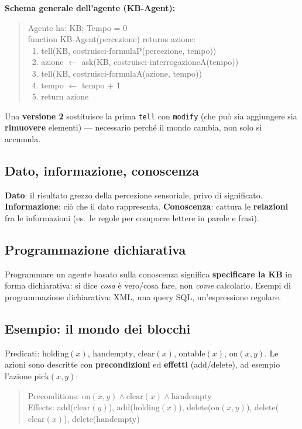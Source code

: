\documentclass[11pt,a4paper]{report}
\begin{document}
\textbf{Schema generale dell'agente (KB-Agent):}
\begin{quote}
\ttfamily
Agente ha: KB; Tempo = 0\\
function KB-Agent(percezione) returns azione:\\
\ 1. tell(KB, costruisci-formulaP(percezione, tempo))\\
\ 2. azione $\leftarrow$ ask(KB, costruisci-interrogazioneA(tempo))\\
\ 3. tell(KB, costruisci-formulaA(azione, tempo))\\
\ 4. tempo $\leftarrow$ tempo + 1\\
\ 5. return azione
\end{quote}

Una \textbf{versione 2} sostituisce la prima \texttt{tell} con \texttt{modify} (che può sia aggiungere sia \textbf{rimuovere} elementi) --- necessario perché il mondo cambia, non solo si accumula.

\subsection*{Dato, informazione, conoscenza}

\textbf{Dato}: il risultato grezzo della percezione sensoriale, privo di significato. \textbf{Informazione}: ciò che il dato rappresenta. \textbf{Conoscenza}: cattura le \textbf{relazioni} fra le informazioni (es.\ le regole per comporre lettere in parole e frasi).

\subsection*{Programmazione dichiarativa}

Programmare un agente basato sulla conoscenza significa \textbf{specificare la KB} in forma dichiarativa: si dice \emph{cosa} è vero/cosa fare, non \emph{come} calcolarlo. Esempi di programmazione dichiarativa: XML, una query SQL, un'espressione regolare.

\subsection*{Esempio: il mondo dei blocchi}

Predicati: $\text{holding}(x)$, $\text{handempty}$, $\text{clear}(x)$, $\text{ontable}(x)$, $\text{on}(x,y)$. Le azioni sono descritte con \textbf{precondizioni} ed \textbf{effetti} (add/delete), ad esempio l'azione $\text{pick}(x,y)$:
\begin{quote}
Preconditions: $\text{on}(x,y)\wedge\text{clear}(x)\wedge\text{handempty}$\\
Effects: add($\text{clear}(y)$), add($\text{holding}(x)$), delete($\text{on}(x,y)$), delete($\text{clear}(x)$), delete($\text{handempty}$)
\end{quote}
\end{document}
